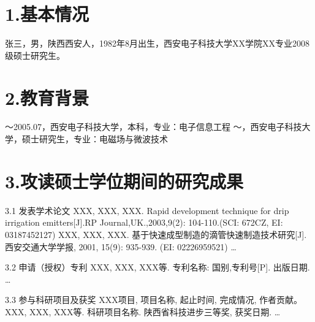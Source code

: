 
\begin{resume}

\section*{1.\hspace{0.75em}基本情况}
张三，男，陕西西安人，1982年8月出生，西安电子科技大学XX学院XX专业2008级硕士研究生。
\section*{2.\hspace{0.75em}教育背景}
\begin{resumelist*}
～2005.07，西安电子科技大学，本科，专业：电子信息工程
～\phantom{2005.07}，西安电子科技大学，硕士研究生，专业：电磁场与微波技术
\end{resumelist*}

\section*{3.\hspace{0.75em}攻读硕士学位期间的研究成果}
\begin{resumelist}{\hspace{-0.25em}3.1\hspace{0.5em} 发表学术论文}
\resumelistitem XXX, XXX, XXX. Rapid development technique for drip irrigation emitters[J].RP Journal,UK.,2003,9(2): 104-110.(SCI: 672CZ, EI: 03187452127)
\resumelistitem XXX, XXX, XXX. 基于快速成型制造的滴管快速制造技术研究[J]. 西安交通大学学报, 2001, 15(9): 935-939. (EI: 02226959521)
\resumelistitem \ldots
\end{resumelist}

\begin{resumelist}{\hspace{-0.25em}3.2\hspace{0.5em} 申请（授权）专利}
\resumelistitem XXX, XXX, XXX等. 专利名称: 国别,专利号[P]. 出版日期.
\resumelistitem \ldots
\end{resumelist}

\begin{resumelist}{\hspace{-0.25em}3.3\hspace{0.5em} 参与科研项目及获奖}
\resumelistitem XXX项目, 项目名称, 起止时间, 完成情况, 作者贡献。
\resumelistitem XXX, XXX, XXX等. 科研项目名称. 陕西省科技进步三等奖, 获奖日期.
\resumelistitem \ldots
\end{resumelist}
\end{resume}

